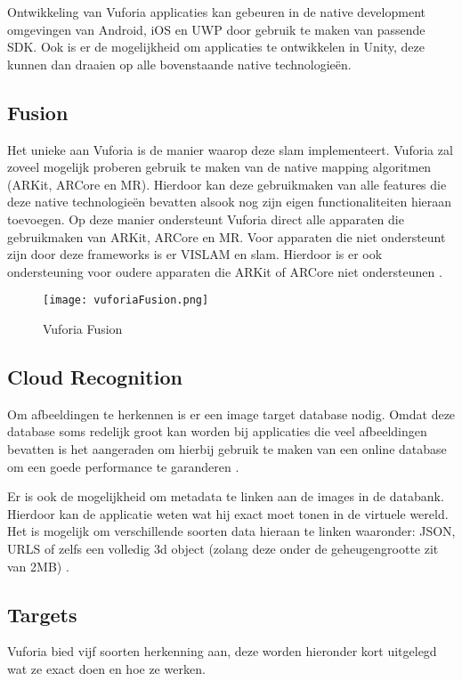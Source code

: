 Ontwikkeling van Vuforia applicaties kan gebeuren in de native development omgevingen van Android, iOS en UWP door gebruik te maken van passende SDK. Ook is er de mogelijkheid om applicaties te ontwikkelen in Unity, deze kunnen dan draaien op alle bovenstaande native technologieën.

\subsection{Fusion}
Het unieke aan Vuforia is de manier waarop deze \acrshort{slam} implementeert. Vuforia zal zoveel mogelijk proberen gebruik te maken van de native mapping algoritmen (ARKit, ARCore en MR). Hierdoor kan deze gebruikmaken van alle features die deze native technologieën bevatten alsook nog zijn eigen functionaliteiten hieraan toevoegen. Op deze manier ondersteunt Vuforia direct alle apparaten die gebruikmaken van ARKit, ARCore en MR. Voor apparaten die niet ondersteunt zijn door deze frameworks is er VISLAM en \acrshort{slam}. Hierdoor is er ook ondersteuning voor oudere apparaten die ARKit of ARCore niet ondersteunen \autocite{VuforiaFusion}.
\begin{figure}
    \texttt{[image: vuforiaFusion.png]}
    \caption{Vuforia Fusion}
    \label{fig:vuforiaFusion}
\end{figure}

\subsection{Cloud Recognition}
Om afbeeldingen te herkennen is er een image target database nodig. Omdat deze database soms redelijk groot kan worden bij applicaties die veel afbeeldingen bevatten is het aangeraden om hierbij gebruik te maken van een online database om een goede performance te garanderen \autocite{VuforiaCloudReco}. 

Er is ook de mogelijkheid om metadata te linken aan de images in de databank. Hierdoor kan de applicatie weten wat hij exact moet tonen in de virtuele wereld. Het is mogelijk om verschillende soorten data hieraan te linken waaronder: JSON, URLS of zelfs een volledig 3d object (zolang deze onder de geheugengrootte zit van 2MB) \autocite{VuforiaCloudReco}.

\subsection{Targets}
Vuforia bied vijf soorten herkenning aan, deze worden hieronder kort uitgelegd wat ze exact doen en hoe ze werken.


